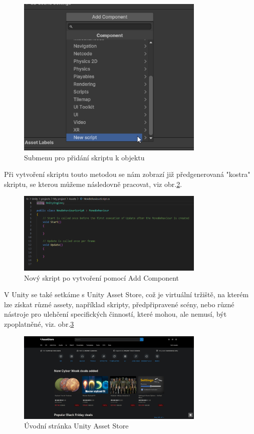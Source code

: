 \documentclass[a4paper,oneside,12pt]{book}
\begin{document}
\begin{figure}[H]
	\centering
	\includegraphics[width=0.8\textwidth]{obrazky/unity_pridani_skript.png}
	\caption{Submenu pro přidání skriptu k objektu}
	\label{fig:unity_novy_skript}
\end{figure}

Při vytvoření skriptu touto metodou se nám zobrazí již předgenerovaná "kostra" skriptu, se kterou můžeme následovně pracovat, viz obr.\ref{fig:unity_skript}.

\begin{figure}[H]
	\centering
	\includegraphics[width=0.8\textwidth]{obrazky/unity_skript_kostra.png}
	\caption{Nový skript po vytvoření pomocí Add Component}
	\label{fig:unity_skript}
\end{figure}

V Unity se také setkáme s Unity Asset Store, což je virtuální tržiště, na kterém lze získat různé assety, například skripty, předpřipravené scény, nebo různé nástroje pro ulehčení specifických činností, které mohou, ale nemusí, být zpoplatněné, viz. obr.\ref{fig:unity_asset_store}

\begin{figure}[H]
	\centering
	\includegraphics[width=0.8\textwidth]{obrazky/unity_asset_store.jpeg}
	\caption{Úvodní stránka Unity Asset Store}
	\label{fig:unity_asset_store}
\end{figure}
\end{document}
